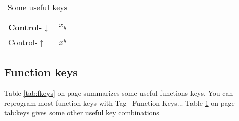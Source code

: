 \begin{itemize}
\begin{table}[tbp]
\begin{singlespaced}
\begin{tabular}{|l|l|}
Control-$\downarrow $ & $x_{y}$ \\ \hline
Control-$\uparrow $ & $x^{y}$ \\ \hline
\end{tabular}%
\end{singlespaced}%
\caption{Some useful keys}\label{tab:keys}%
\end{table}%
\end{itemize}

\subsection{Function keys}

Table \ref{tab:fkeys} on page \pageref{tab:fkeys} summarizes some useful
functions keys. You can reprogram most function keys with Tag \TEXTsymbol{>}%
\TEXTsymbol{>}\ Function Keys... Table \ref{tab:keys} on page \pageref%
{tab:keys} gives some other useful key combinations

